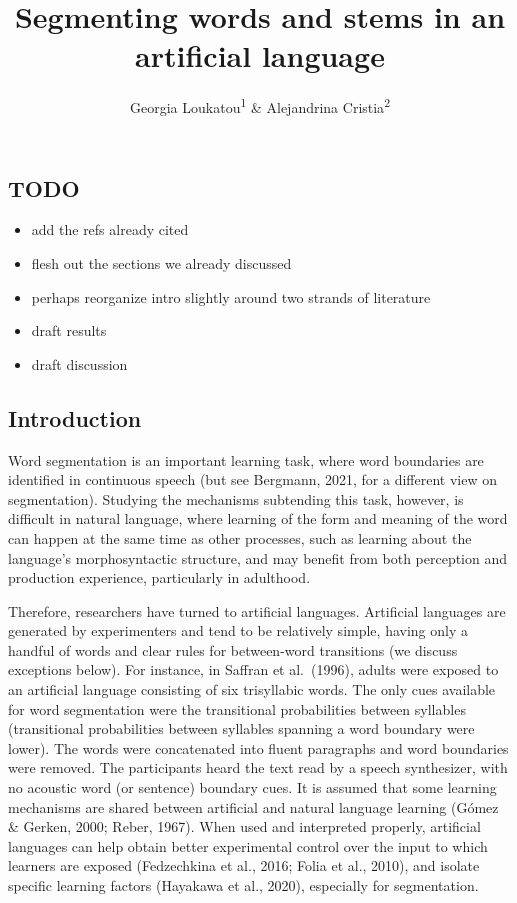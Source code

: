 \documentclass[
  american,
  ,man,floatsintext]{apa6}
\title{Segmenting words and stems in an artificial language}
\author{Georgia Loukatou\textsuperscript{1} \& Alejandrina Cristia\textsuperscript{2}}
\date{}
\affiliation{\vspace{0.5cm}\textsuperscript{1} Stanford University\\\textsuperscript{2} Laboratoire de Sciences Cognitives et de Psycholinguistique, Département d'Etudes Cognitives, ENS, EHESS, CNRS, PSL University}
\providecommand{\tightlist}{%
  \setlength{\itemsep}{0pt}\setlength{\parskip}{0pt}}
\begin{document}
\maketitle

\hypertarget{todo}{%
\subsection{TODO}\label{todo}}

\begin{itemize}
\tightlist
\item
  add the refs already cited
\item
  flesh out the sections we already discussed
\item
  perhaps reorganize intro slightly around two strands of literature
\item
  draft results
\item
  draft discussion
\end{itemize}

\hypertarget{introduction}{%
\subsection{Introduction}\label{introduction}}

Word segmentation is an important learning task, where word boundaries are identified in continuous speech (but see Bergmann, 2021, for a different view on segmentation). Studying the mechanisms subtending this task, however, is difficult in natural language, where learning of the form and meaning of the word can happen at the same time as other processes, such as learning about the language's morphosyntactic structure, and may benefit from both perception and production experience, particularly in adulthood.

Therefore, researchers have turned to artificial languages. Artificial languages are generated by experimenters and tend to be relatively simple, having only a handful of words and clear rules for between-word transitions (we discuss exceptions below). For instance, in Saffran et al.~(1996), adults were exposed to an artificial language consisting of six trisyllabic words. The only cues available for word segmentation were the transitional probabilities between syllables (transitional probabilities between syllables spanning a word boundary were lower). The words were concatenated into fluent paragraphs and word boundaries were removed. The participants heard the text read by a speech synthesizer, with no acoustic word (or sentence) boundary cues. It is assumed that some learning mechanisms are shared between artificial and natural language learning (Gómez \& Gerken, 2000; Reber, 1967). When used and interpreted properly, artificial languages can help obtain better experimental control over the input to which learners are exposed (Fedzechkina et al., 2016; Folia et al., 2010), and isolate specific learning factors (Hayakawa et al., 2020), especially for segmentation.
\end{document}
